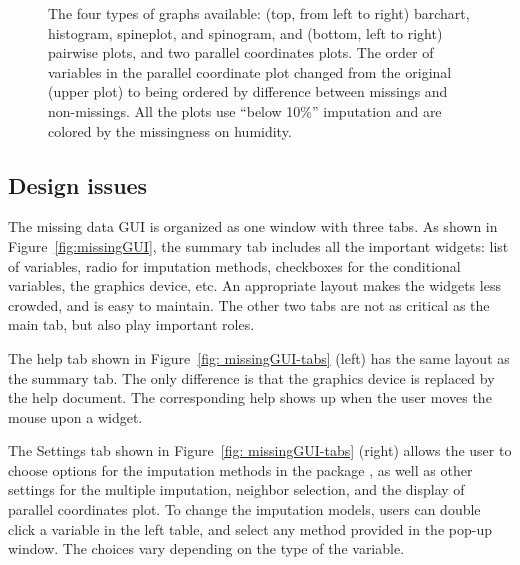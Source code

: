 \documentclass[article]{jss}
\begin{document}
\begin{center}
\begin{figure}[h]
\begin{centering}
\par\end{centering}
\caption{The four types of graphs available: (top, from left
to right) barchart, histogram, spineplot, and spinogram, and
(bottom, left to right) pairwise plots, and two parallel
coordinates plots. The order of variables in the parallel
coordinate plot changed from the original (upper plot) to
being ordered by difference between missings and non-missings.
All the plots use ``below 10\%'' imputation and are colored
by the missingness on humidity.}
\label{fig:graphtypes}
\end{figure}
\par\end{center}


\subsection{Design issues}

The missing data GUI is organized as one window with three tabs.
As shown in Figure~\ref{fig:missingGUI}, the summary tab
includes all the important widgets: list of variables, radio
for imputation methods, checkboxes for the conditional variables,
the graphics device, etc. An appropriate layout makes the widgets
less crowded, and is easy to maintain. The other two tabs are
not as critical as the main tab, but also play important roles.

The help tab shown in Figure~\ref{fig: missingGUI-tabs} (left)
has the same layout as the summary tab. The only difference is
that the graphics device is replaced by the help document. The
corresponding help shows up when the user moves the mouse upon
a widget.

The Settings tab shown in Figure~\ref{fig: missingGUI-tabs}
(right) allows the user to choose options for the imputation
methods in the package , as well as other settings
for the multiple imputation, neighbor selection, and the
display of parallel coordinates plot. To change the imputation
models, users can double click a variable in the left table,
and select any method provided in the pop-up window. The
choices vary depending on the type of the variable.
\end{document}
